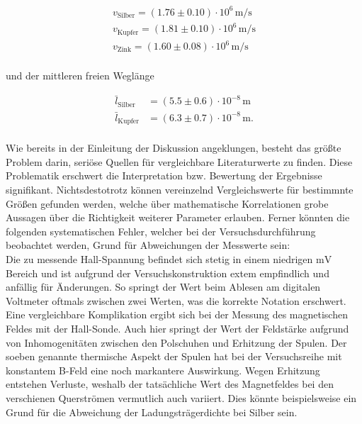 \begin{align*}
    v_\text{Silber} = \left(1.76\pm0.10\right)\cdot10^{6}\,\unit{\meter\per\second}\\
    v_\text{Kupfer} = \left(1.81\pm0.10\right)\cdot10^{6}\,\unit{\meter\per\second}\\
    v_\text{Zink} = \left(1.60\pm0.08\right)\cdot10^{6}\,\unit{\meter\per\second}\\
\end{align*}

\noindent und der mittleren freien Weglänge

\begin{align*}
    \bar{l}_\text{Silber} &= \left(5.5\pm0.6\right)\cdot10^{-8}\,\unit{\meter}\\
    \bar{l}_\text{Kupfer} &= \left(6.3\pm0.7\right)\cdot10^{-8}\,\unit{\meter}.\\
\end{align*}

\noindent Wie bereits in der Einleitung der Diskussion angeklungen, besteht das größte Problem darin, seriöse 
Quellen für vergleichbare Literaturwerte zu finden. Diese Problematik erschwert die Interpretation bzw. Bewertung 
der Ergebnisse signifikant. Nichtsdestotrotz können vereinzelnd Vergleichswerte für bestimmnte Größen gefunden werden, 
welche über mathematische Korrelationen grobe Aussagen über die Richtigkeit weiterer Parameter erlauben. Ferner 
könnten die folgenden systematischen Fehler, welcher bei der Versuchsdurchführung beobachtet werden, Grund für 
Abweichungen der Messwerte sein:\\

\noindent Die zu messende Hall-Spannung befindet sich stetig in einem niedrigen $\unit{\milli\volt}$ Bereich und ist 
aufgrund der Versuchskonstruktion extem empfindlich und anfällig für Änderungen. So springt der Wert beim Ablesen am 
digitalen Voltmeter oftmals zwischen zwei Werten, was die korrekte Notation erschwert. Eine vergleichbare Komplikation 
ergibt sich bei der Messung des magnetischen Feldes mit der Hall-Sonde. Auch hier springt der Wert der Feldstärke 
aufgrund von Inhomogenitäten zwischen den Polschuhen und Erhitzung der Spulen. Der soeben genannte thermische Aspekt 
der Spulen hat bei der Versuchsreihe mit konstantem B-Feld eine noch markantere Auswirkung. Wegen Erhitzung entstehen 
Verluste, weshalb der tatsächliche Wert des Magnetfeldes bei den verschienen Querströmen vermutlich auch variiert.
Dies könnte beispielsweise ein Grund für die Abweichung der Ladungsträgerdichte bei Silber sein.  












